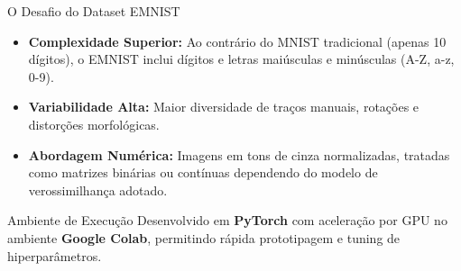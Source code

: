 \documentclass[10pt,aspectratio=169]{beamer}
\begin{document}
\begin{frame}{O Desafio do Dataset EMNIST}
    \begin{itemize}
        \item \textbf{Complexidade Superior:} Ao contrário do MNIST tradicional (apenas 10 dígitos), o EMNIST inclui dígitos e letras maiúsculas e minúsculas (A-Z, a-z, 0-9).
        \item \textbf{Variabilidade Alta:} Maior diversidade de traços manuais, rotações e distorções morfológicas.
        \item \textbf{Abordagem Numérica:} Imagens em tons de cinza normalizadas, tratadas como matrizes binárias ou contínuas dependendo do modelo de verossimilhança adotado.
    \end{itemize}
    \vspace{0.3cm}
    \begin{exampleblock}{Ambiente de Execução}
        Desenvolvido em \textbf{PyTorch} com aceleração por GPU no ambiente \textbf{Google Colab}, permitindo rápida prototipagem e tuning de hiperparâmetros.
    \end{exampleblock}
\end{frame}
\end{document}

